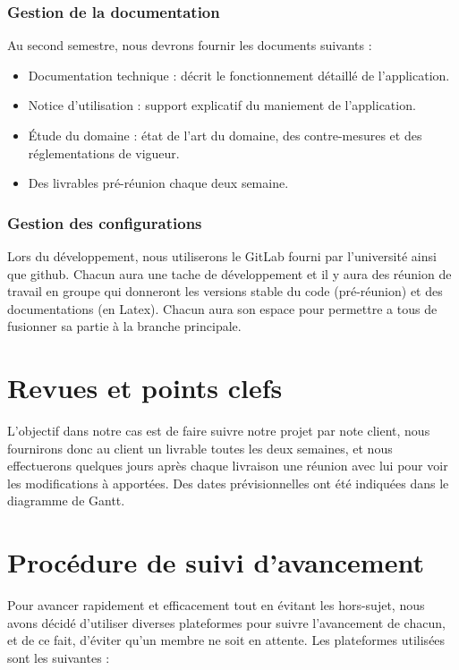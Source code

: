 \subsection{Gestion de la documentation}
		Au second semestre, nous devrons fournir les documents suivants :
		\begin{itemize}
			\item Documentation technique : décrit le fonctionnement détaillé de l’application.
			\item Notice d’utilisation : support explicatif du maniement de l’application.
			\item Étude du domaine : état de l’art du domaine, des contre-mesures et des
			réglementations de vigueur.
			\item Des livrables pré-réunion chaque deux semaine.\\ \newline
		\end{itemize}
	
		\subsection{Gestion des configurations}
		Lors du développement, nous utiliserons le GitLab fourni par l’université ainsi que github. Chacun
		aura une tache de développement et il y aura des réunion de travail en groupe qui donneront les versions
		stable du code (pré-réunion) et des documentations (en Latex). Chacun aura son espace pour
		permettre a tous de fusionner sa partie à la branche principale.



\chapter{Revues et points clefs}

L'objectif dans notre cas est de faire suivre notre projet par note client,
nous fournirons donc au client un livrable toutes les deux semaines, et nous effectuerons
quelques jours après chaque livraison une réunion avec lui pour voir les modifications à
apportées. Des dates prévisionnelles ont été indiquées dans le diagramme de Gantt.

\chapter{Procédure de suivi d'avancement}

Pour avancer rapidement et efficacement tout en évitant les hors-sujet, nous avons
décidé d’utiliser diverses plateformes pour suivre l’avancement de chacun, et de ce fait,
d’éviter qu’un membre ne soit en attente. Les plateformes utilisées sont les suivantes :\\ \newline

